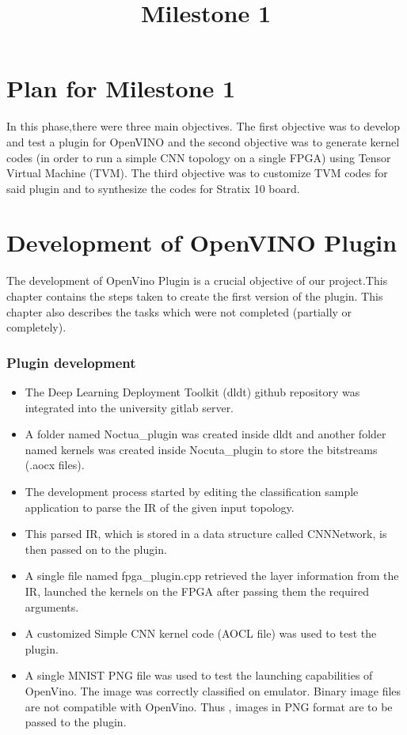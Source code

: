 \documentclass[titlepage]{report}
\title{\textbf{Milestone 1}}
\begin{document}
\maketitle

\tableofcontents{}
\newpage

\chapter{Plan for Milestone 1}
In this phase,there were three main objectives. The first objective was to develop and test  a plugin for OpenVINO and the second objective was to generate  kernel codes (in order to run a simple CNN topology on a single FPGA) using Tensor Virtual Machine (TVM). 
The third objective was to customize TVM codes for said plugin and to synthesize the codes for Stratix 10 board.



\chapter{Development of OpenVINO Plugin}
The development of OpenVino Plugin is a crucial objective of our project.This chapter contains the steps taken to create the first version of the plugin. This chapter also describes the tasks which were not completed (partially or completely). 
\subsection{Plugin development}
\begin{itemize}
\item The Deep Learning Deployment Toolkit (dldt) github repository was integrated into the university gitlab server. 
\item A folder named Noctua\_plugin was created inside dldt and another folder named kernels was created inside Nocuta\_plugin to store the bitstreams (.aocx files).
\item The development process started by editing the classification sample application to parse the IR of the given input topology. 
\item This parsed IR, which is stored in a data structure called CNNNetwork, is then passed on to the plugin. 
\item A single file named fpga\_plugin.cpp retrieved the layer information from the IR, launched the kernels on the FPGA after passing them the required arguments.
\item A customized Simple CNN kernel code (AOCL file) was used to test the plugin.
\item A single MNIST PNG file was used to test the launching capabilities of OpenVino. The image was correctly classified on emulator. Binary image files are not compatible with OpenVino. Thus , images in PNG format are to be passed to the plugin.
\end{itemize} 
\end{document}
